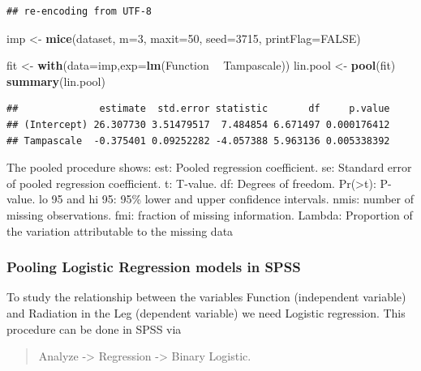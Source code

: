 \documentclass[]{book}
\newenvironment{Shaded}{\begin{snugshade}}{\end{snugshade}}
\newcommand{\KeywordTok}[1]{\textcolor[rgb]{0.13,0.29,0.53}{\textbf{#1}}}
\newcommand{\DataTypeTok}[1]{\textcolor[rgb]{0.13,0.29,0.53}{#1}}
\newcommand{\DecValTok}[1]{\textcolor[rgb]{0.00,0.00,0.81}{#1}}
\newcommand{\StringTok}[1]{\textcolor[rgb]{0.31,0.60,0.02}{#1}}
\newcommand{\OtherTok}[1]{\textcolor[rgb]{0.56,0.35,0.01}{#1}}
\newcommand{\OperatorTok}[1]{\textcolor[rgb]{0.81,0.36,0.00}{\textbf{#1}}}
\newcommand{\NormalTok}[1]{#1}
\begin{document}
\begin{verbatim}
## re-encoding from UTF-8
\end{verbatim}

\begin{Shaded}
\begin{Highlighting}[]
\NormalTok{imp <-}\StringTok{ }\KeywordTok{mice}\NormalTok{(dataset, }\DataTypeTok{m=}\DecValTok{3}\NormalTok{, }\DataTypeTok{maxit=}\DecValTok{50}\NormalTok{, }\DataTypeTok{seed=}\DecValTok{3715}\NormalTok{, }\DataTypeTok{printFlag=}\OtherTok{FALSE}\NormalTok{)}

\NormalTok{fit <-}\StringTok{ }\KeywordTok{with}\NormalTok{(}\DataTypeTok{data=}\NormalTok{imp,}\DataTypeTok{exp=}\KeywordTok{lm}\NormalTok{(Function }\OperatorTok{~}\StringTok{ }\NormalTok{Tampascale))}
\NormalTok{lin.pool <-}\StringTok{ }\KeywordTok{pool}\NormalTok{(fit)}
\KeywordTok{summary}\NormalTok{(lin.pool)}
\end{Highlighting}
\end{Shaded}

\begin{verbatim}
##              estimate  std.error statistic       df     p.value
## (Intercept) 26.307730 3.51479517  7.484854 6.671497 0.000176412
## Tampascale  -0.375401 0.09252282 -4.057388 5.963136 0.005338392
\end{verbatim}

The pooled procedure shows: est: Pooled regression coefficient. se:
Standard error of pooled regression coefficient. t: T-value. df: Degrees
of freedom. Pr(\textgreater{}\textbar{}t\textbar{}): P-value. lo 95 and
hi 95: 95\% lower and upper confidence intervals. nmis: number of
missing observations. fmi: fraction of missing information. Lambda:
Proportion of the variation attributable to the missing data

\subsubsection{Pooling Logistic Regression models in
SPSS}\label{pooling-logistic-regression-models-in-spss}

To study the relationship between the variables Function (independent
variable) and Radiation in the Leg (dependent variable) we need Logistic
regression. This procedure can be done in SPSS via

\begin{quote}
Analyze -\textgreater{} Regression -\textgreater{} Binary Logistic.
\end{quote}
\end{document}
